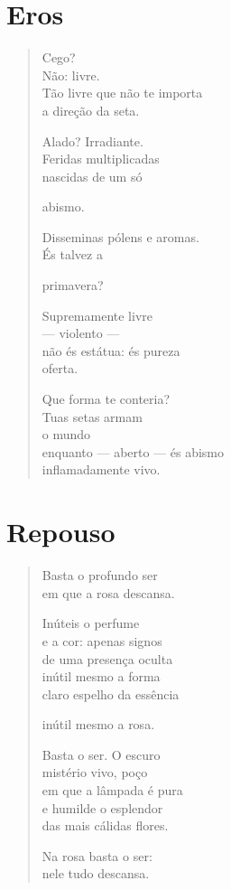 \chapter{Eros}

\begin{verse}
Cego?\\
Não: livre.\\
Tão livre que não te importa\\
a direção da seta.

Alado? Irradiante.\\
Feridas multiplicadas\\
nascidas de um só

\qquad\qquad\qquad\qquad\mbox{} abismo.

Disseminas pólens e aromas.\\
És talvez a

\qquad\qquad\qquad\quad primavera?

Supremamente livre\\
\qquad\qquad --- violento ---\\
não és estátua: és pureza\\
\qquad\qquad\qquad\qquad\mbox{} oferta.

Que forma te conteria?\\
Tuas setas armam\\
\qquad\qquad\qquad\qquad o mundo\\
enquanto --- aberto --- és abismo\\
\qquad\qquad inflamadamente vivo.
\end{verse}

\chapter{Repouso}

\begin{verse}
Basta o profundo ser\\
em que a rosa descansa.

Inúteis o perfume\\
e a cor: apenas signos\\
de uma presença oculta\\
inútil mesmo a forma\\
claro espelho da essência

inútil mesmo a rosa.

Basta o ser. O escuro\\
mistério vivo, poço\\
em que a lâmpada é pura\\
e humilde o esplendor\\
das mais cálidas flores.

Na rosa basta o ser:\\
nele tudo descansa.
\end{verse}


